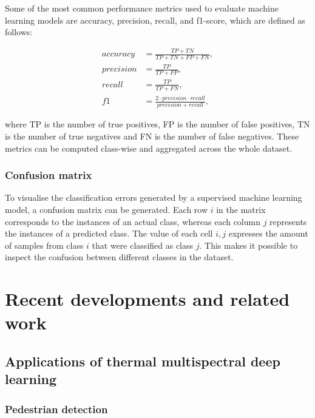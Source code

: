 \documentclass{l4proj}
\begin{document}
Some of the most common performance metrics used to evaluate machine learning models are accuracy, precision, recall, and f1-score, which are defined as follows:

\begin{align}
  accuracy  &= \frac {TP + TN} {TP + TN + FP + FN}, \\
  precision &= \frac {TP} {TP + FP}, \\
  recall    &= \frac {TP} {TP + FN}, \\
  f1        &= \frac {2 \cdot precision \cdot recall} {precision + recall},
\end{align}

where TP is the number of true positives, FP is the number of false positives, TN is the number of true negatives and FN is the number of false negatives. These metrics can be computed class-wise and aggregated across the whole dataset.

\subsubsection{Confusion matrix}

To visualise the classification errors generated by a supervised machine learning model, a confusion matrix can be generated. Each row $i$ in the matrix corresponds to the instances of an actual class, whereas each column $j$ represents the instances of a predicted class. The value of each cell $i, j$ expresses the amount of samples from class $i$ that were classified as class $j$. This makes it possible to inspect the confusion between different classes in the dataset.


\section{Recent developments and related work}

\subsection{Applications of thermal multispectral deep learning}

\subsubsection{Pedestrian detection}
\end{document}
